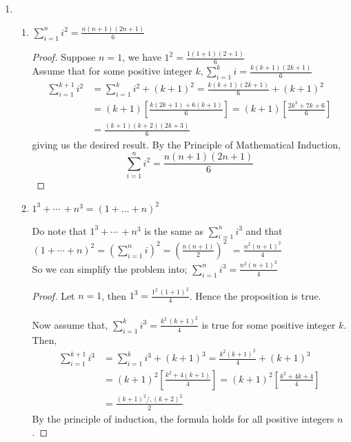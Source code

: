\documentclass[11pt]{amsart}
\begin{document}
\begin{enumerate}[label=\arabic*.]
	\item 
		\begin{enumerate}[label=(\roman*)]
		\item $\sum_{i=1}^{n} i^2 = \frac{n(n+1)(2n+1)}{6}$\\
			\medskip
			\begin{proof}
				Suppose $n=1$, we have $1^2 = \frac{1(1+1)(2+1)}{6}$ \\
				Assume that for some positive integer $k, \sum_{i=1}^{k} i = \frac{k(k+1)(2k+1)}{6}$ \\
				\begin{align*}
					\sum_{i=1}^{k+1} i^2 &= \sum_{i=1}^{k} i^2 + (k+1)^2 = \frac{k(k+1)(2k+1)}{6} + (k+1)^2 \\
					&= (k+1)\left[\frac{k(2k+1)+6(k+1)}{6}\right] = (k+1)\left[\frac{2k^3 +7k + 6}{6}\right] \\
					&= \frac{(k+1)(k+2)(2k+3)}{6}
				\end{align*}
				giving us the desired result. By the Principle of Mathematical Induction,
				\[
					\sum_{i=1}^{n} i^2 = \frac{n(n+1)(2n+1)}{6}
				\]
			\end{proof}
		\item $1^3 + \cdots \, + n^3 = \left(1 + \dots + n\right)^2$ \\
			\medskip

			Do note that $1^3 + \cdots \, + n^3$ is the same as $\sum_{i=1}^n i^3$ and that\\
			$\left(1 + \cdots + n\right)^2 = \left(\sum_{i=1}^n i\right)^2 = \left(\frac{n(n+1)}{2}\right)^2$
			$= \frac{n^2(n+1)^2}{4}$ \\

			So we can simplify the problem into;
			$\sum_{i=1}^n i^3 = \frac{n^2(n+1)^2}{4}$ \\
			\begin{proof}
				Let $n=1$, then $1^3 = \frac{1^2 \, (1+1)^2}{4}$. Hence the proposition is true.\\
				\medskip\\
				Now assume that, $\sum_{i=1}^{k} i^3 = \frac{k^2\,(k+1)^2}{4}$ is true for some positive integer $k$.
				Then,\\
				\begin{align*}
					\sum_{i=1}^{k+1} i^3 &= \sum_{i=1}^{k} i^3 + (k+1)^3 = \frac{k^2 (k+1)^2}{4} + (k+1)^3 \\
							     &= (k+1)^2 \left[\frac{k^2 + 4(k+1)}{4}\right] = (k+1)^2\left[\frac{k^2 + 4k + 4}{4}\right]\\
					&= \frac{(k+1)^2/,(k+2)^2}{2}
				\end{align*}
       			By the principle of induction, the formula holds for all positive integers $n$.
			\end{proof}
	\end{enumerate}
\end{enumerate}
\end{document}
